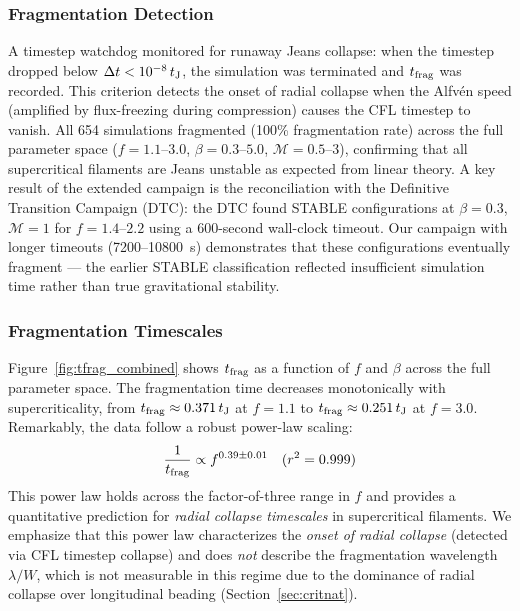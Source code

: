 \documentclass[twoside,twocolumn]{mnras}
\begin{document}
\subsubsection{Fragmentation Detection}

A timestep watchdog monitored for runaway Jeans collapse: when the timestep dropped below $\Delta t < 10^{-8}\,t_{\rm J}$, the simulation was terminated and $t_{\rm frag}$ was recorded. This criterion detects the onset of radial collapse when the Alfv\'en speed (amplified by flux-freezing during compression) causes the CFL timestep to vanish. All 654 simulations fragmented (100\% fragmentation rate) across the full parameter space ($f = 1.1$--$3.0$, $\beta = 0.3$--$5.0$, $\mathcal{M} = 0.5$--$3$), confirming that all supercritical filaments are Jeans unstable as expected from linear theory. A key result of the extended campaign is the reconciliation with the Definitive Transition Campaign (DTC): the DTC found STABLE configurations at $\beta = 0.3$, $\mathcal{M} = 1$ for $f = 1.4$--$2.2$ using a 600-second wall-clock timeout. Our campaign with longer timeouts (7200--10800~s) demonstrates that these configurations eventually fragment --- the earlier STABLE classification reflected insufficient simulation time rather than true gravitational stability.

\subsubsection{Fragmentation Timescales}

Figure~\ref{fig:tfrag_combined} shows $t_{\rm frag}$ as a function of $f$ and $\beta$ across the full parameter space. The fragmentation time decreases monotonically with supercriticality, from $t_{\rm frag} \approx 0.371\,t_{\rm J}$ at $f = 1.1$ to $t_{\rm frag} \approx 0.251\,t_{\rm J}$ at $f = 3.0$. Remarkably, the data follow a robust power-law scaling:
\begin{equation}
\frac{1}{t_{\rm frag}} \propto f^{0.39 \pm 0.01} \quad (r^2 = 0.999)
\end{equation}
This power law holds across the factor-of-three range in $f$ and provides a quantitative prediction for \textit{radial collapse timescales} in supercritical filaments. We emphasize that this power law characterizes the \textit{onset of radial collapse} (detected via CFL timestep collapse) and does \textit{not} describe the fragmentation wavelength $\lambda/W$, which is not measurable in this regime due to the dominance of radial collapse over longitudinal beading (Section~\ref{sec:critnat}).
\end{document}
